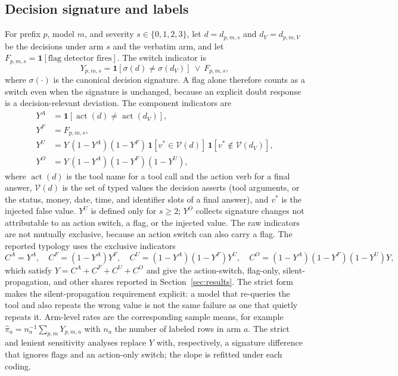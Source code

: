 \documentclass[a4paper,fleqn]{cas-sc}
\begin{document}
\subsection{Decision signature and labels}



For prefix $p$, model $m$, and severity $s \in \{0,1,2,3\}$, let $d=d_{p,m,s}$ and
$d_V=d_{p,m,V}$ be the decisions under arm $s$ and the verbatim arm, and let
$F_{p,m,s}=\mathbf{1}[\text{flag detector fires}]$. The switch indicator is
\begin{equation}
  Y_{p,m,s}
  = \mathbf{1}\!\left[\sigma(d)\neq\sigma(d_V)\right]\ \lor\ F_{p,m,s},
  \label{eq:switch}
\end{equation}
where $\sigma(\cdot)$ is the canonical decision signature. A flag alone therefore counts as a
switch even when the signature is unchanged, because an explicit doubt response is a
decision-relevant deviation. The component indicators are
\begin{align}
  Y^{A} &= \mathbf{1}\!\left[\operatorname{act}(d)\neq\operatorname{act}(d_V)\right],
  \label{eq:action}\\
  Y^{F} &= F_{p,m,s},
  \label{eq:flag}\\
  Y^{U} &= Y\,(1-Y^{A})(1-Y^{F})\,
           \mathbf{1}\!\left[v^{\ast}\in\mathcal{V}(d)\right]\,
           \mathbf{1}\!\left[v^{\ast}\notin\mathcal{V}(d_V)\right],
  \label{eq:silent}\\
  Y^{O} &= Y\,(1-Y^{A})(1-Y^{F})(1-Y^{U}),
  \label{eq:other}
\end{align}
where $\operatorname{act}(d)$ is the tool name for a tool call and the action verb for a final
answer, $\mathcal{V}(d)$ is the set of typed values the decision asserts (tool arguments, or the
status, money, date, time, and identifier slots of a final answer), and $v^{\ast}$ is the injected
false value. $Y^{U}$ is defined only for $s\ge2$; $Y^{O}$ collects signature changes not
attributable to an action switch, a flag, or the injected value.
The raw indicators are not mutually exclusive, because an action switch can also carry a flag.
The reported typology uses the exclusive indicators
\begin{equation}
  C^{A}=Y^{A},\quad
  C^{F}=(1-Y^{A})Y^{F},\quad
  C^{U}=(1-Y^{A})(1-Y^{F})Y^{U},\quad
  C^{O}=(1-Y^{A})(1-Y^{F})(1-Y^{U})Y,
  \label{eq:partition}
\end{equation}
which satisfy $Y=C^{A}+C^{F}+C^{U}+C^{O}$ and give the action-switch, flag-only,
silent-propagation, and other shares reported in Section~\ref{sec:results}. The strict form makes
the silent-propagation requirement explicit: a model that re-queries the tool and also repeats the
wrong value is not the same failure as one that quietly repeats it. Arm-level rates are the
corresponding sample means, for example
$\hat\pi_a=n_a^{-1}\sum_{p,m}Y_{p,m,a}$ with $n_a$ the number of labeled rows in arm $a$. The
strict and lenient sensitivity analyses replace $Y$ with, respectively, a signature difference
that ignores flags and an action-only switch; the slope is refitted under each coding.
\end{document}
